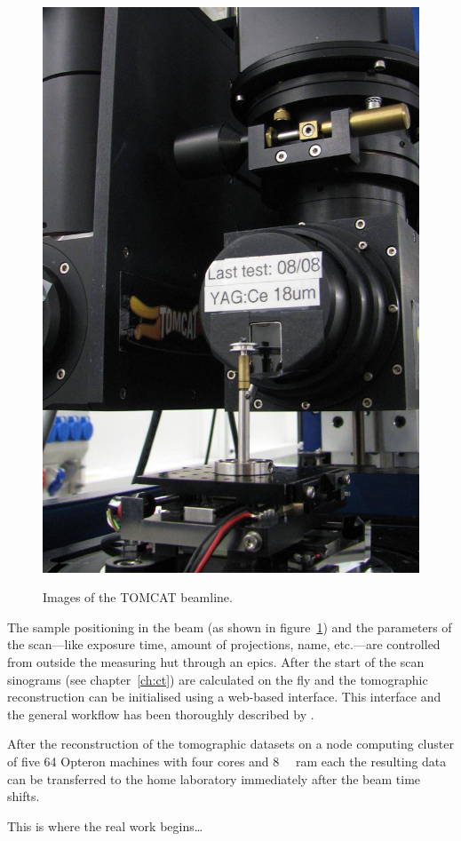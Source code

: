 \begin{figure}[h]
{		\includegraphics[width=\imsize]{img/TOMCAT2}%
		\label{subfig:TOMCAT2}%
		}%
	\caption{Images of the TOMCAT beamline.}
	\label{fig:tomcat}
\end{figure}

The sample positioning in the beam (as shown in figure~\ref{fig:tomcat}) and the parameters of the scan---like exposure time, amount of projections, name, etc.---are controlled from outside the measuring hut through an \ac{epics}. After the start of the scan sinograms (see chapter~\ref{ch:ct}) are calculated on the fly and the tomographic reconstruction can be initialised using a web-based interface. This interface and the general workflow has been thoroughly described by \citet{Hintermueller2010}.

After the reconstruction of the tomographic datasets on a node computing cluster of five \SI{64}{\bit} Opteron machines with four cores and \SI{8}{\giga\byte} \acs{ram} each the resulting data can be transferred to the home laboratory immediately after the beam time shifts.

This is where the real work begins\ldots